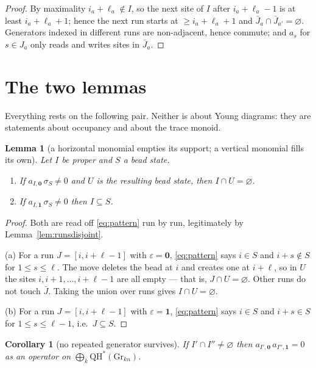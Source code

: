 \documentclass[11pt]{article}
\theoremstyle{plain}
\newtheorem{lemma}[theorem]{Lemma}
\newtheorem{corollary}[theorem]{Corollary}
\theoremstyle{definition}
\newcommand{\QH}{\mathrm{QH}^*}
\newcommand{\Gr}{\mathrm{Gr}}
\begin{document}
\begin{proof}
By maximality $i_a+\ell_a\notin I$, so the next site of $I$ after
$i_a+\ell_a-1$ is at least $i_a+\ell_a+1$; hence the next run starts at
$\ge i_a+\ell_a+1$ and $\bar J_a\cap\bar J_{a'}=\varnothing$.  Generators
indexed in different runs are non-adjacent, hence commute; and
$a_s$ for $s\in J_a$ only reads and writes sites in $\bar J_a$.
\end{proof}

\section{The two lemmas}\label{sec:two}

Everything rests on the following pair.  Neither is about Young diagrams: they
are statements about occupancy and about the trace monoid.

\begin{lemma}[a horizontal monomial empties its support; a vertical monomial
fills its own]\label{lem:emptyfill}
Let $I$ be proper and $S$ a bead state.
\begin{enumerate}
\item[(a)] If $a_{I,\mathbf 0}\,\sigma_S\ne0$ and $U$ is the resulting bead
state, then $I\cap U=\varnothing$.
\item[(b)] If $a_{I,\mathbf 1}\,\sigma_S\ne0$ then $I\subseteq S$.
\end{enumerate}
\end{lemma}

\begin{proof}
Both are read off \eqref{eq:pattern} run by run, legitimately by
Lemma~\ref{lem:runsdisjoint}.

(a) For a run $J=[i,i+\ell-1]$ with $\varepsilon=\mathbf 0$, \eqref{eq:pattern}
says $i\in S$ and $i+s\notin S$ for $1\le s\le\ell$.  The move deletes the bead
at $i$ and creates one at $i+\ell$, so in $U$ the sites $i,i+1,\dots,i+\ell-1$
are all empty --- that is, $J\cap U=\varnothing$.  Other runs do not touch
$\bar J$.  Taking the union over runs gives $I\cap U=\varnothing$.

(b) For a run $J=[i,i+\ell-1]$ with $\varepsilon=\mathbf 1$, \eqref{eq:pattern}
says $i\in S$ and $i+s\in S$ for $1\le s\le\ell-1$, i.e.\ $J\subseteq S$.
\end{proof}

\begin{corollary}[no repeated generator survives]\label{cor:norepeat}
If $I'\cap I''\ne\varnothing$ then $a_{I',\mathbf 0}\,a_{I'',\mathbf 1}=0$ as an
operator on $\bigoplus_k\QH(\Gr_{kn})$.
\end{corollary}
\end{document}
